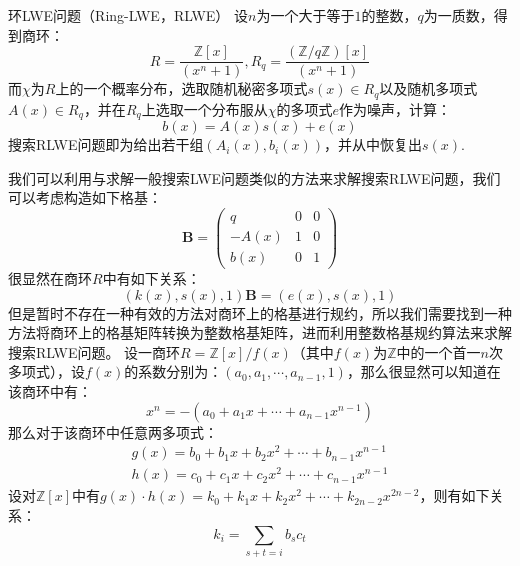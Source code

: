 \documentclass{book}
\numberwithin{equation}{subsubsection}
\begin{document}
\begin{concept}{环LWE问题（Ring-LWE，RLWE）}
    设$n$为一个大于等于$1$的整数，$q$为一质数，得到商环：
    \begin{equation}
        R=\frac{\mathbb{Z}[x]}{(x^n+1)},R_q=\frac{(\mathbb{Z}/q\mathbb{Z})[x]}{(x^n+1)}
        \nonumber
    \end{equation}
    而$\chi$为$R$上的一个概率分布，选取随机秘密多项式$s(x)\in R_q$以及随机多项式$A(x)\in R_q$，并在$R_q$上选取一个分布服从$\chi$的多项式$e$作为噪声，计算：
    \begin{equation}
        b(x)=A(x)s(x)+e(x)
        \nonumber
    \end{equation}
    搜索RLWE问题即为给出若干组$(A_i(x),b_i(x))$，并从中恢复出$s(x)$.
\end{concept}
我们可以利用与求解一般搜索LWE问题类似的方法来求解搜索RLWE问题，我们可以考虑构造如下格基：
\begin{equation}
    \pmb{B} = \left(\begin{matrix}
        q&0&0\\
        -A(x)&1&0\\
        b(x)&0&1
    \end{matrix}\right)
    \nonumber
\end{equation}
很显然在商环$R$中有如下关系：
\begin{equation}
    (k(x),s(x),1)\pmb{B}=(e(x),s(x),1)
    \nonumber
\end{equation}
但是暂时不存在一种有效的方法对商环上的格基进行规约，所以我们需要找到一种方法将商环上的格基矩阵转换为整数格基矩阵，进而利用整数格基规约算法来求解搜索RLWE问题。
设一商环$R=\mathbb{Z}[x]/f(x)$（其中$f(x)$为$\mathbb{Z}$中的一个首一$n$次多项式），设$f(x)$的系数分别为：$(a_0,a_1,\cdots,a_{n-1},1)$，那么很显然可以知道在该商环中有：
\begin{equation}
    x^{n}=-(a_0+a_1x+\cdots+a_{n-1}x^{n-1})
    \nonumber
\end{equation}
那么对于该商环中任意两多项式：
\begin{equation}
    \begin{aligned}
        g(x)=b_0+b_1x+b_2x^2+\cdots+b_{n-1}x^{n-1}\\h(x)=c_0+c_1x+c_2x^2+\cdots+c_{n-1}x^{n-1}
    \end{aligned}
    \nonumber
\end{equation}
设对$\mathbb{Z}[x]$中有$g(x)\cdot h(x)=k_0+k_1x+k_2x^2+\cdots+k_{2n-2}x^{2n-2}$，则有如下关系：
\begin{equation}
    k_{i}=\sum_{s+t=i}b_sc_t
    \nonumber
\end{equation}
\end{document}
